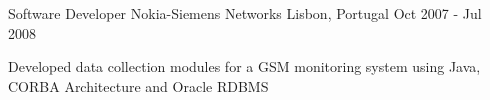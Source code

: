\begin{cventries}
  \cventry
    {Software Developer} %
    {Nokia-Siemens Networks} %
    {Lisbon, Portugal} %
    {Oct 2007 - Jul 2008} %
    {
      \begin{cvitems} %
        \item {Developed data collection modules for a GSM monitoring system using Java, CORBA Architecture and Oracle RDBMS}
      \end{cvitems}
    }

\end{cventries}
